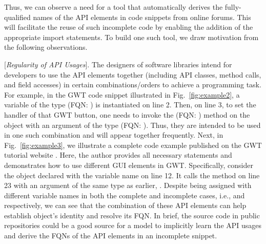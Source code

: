 Thus, we can observe a need for a tool that automatically derives the fully-qualified names of the API elements in code snippets from online forums. This will facilitate the reuse of such incomplete code by enabling the addition of the appropriate import statements. To build one such tool, we draw motivation from the following observations.

\vspace{2pt}
 [{\em Regularity of API Usages}]. The designers of software libraries intend for developers to use the API elements together (including API classes, method calls, and field accesses) in certain combinations/orders to achieve a programming task. For example, in the GWT code snippet illustrated in Fig.~\ref{fig:example2}, a variable of the type  (FQN: ) is instantiated on line 2. Then, on line 3, to set the handler of that GWT button, one needs to invoke the  (FQN: ) method on the  object with an argument of the type  (FQN: ). Thus,
they are intended to be used in one such combination and will appear together frequently. Next, in Fig.~\ref{fig:example3}, we illustrate a complete code example published on the GWT tutorial website . Here, the author provides all necessary  statements and demonstrates how to use different GUI elements in GWT. Specifically, consider the  object declared with the  variable name on line 12. It calls the method  on line 23 with an argument of the same type as earlier, . 
Despite being assigned with different variable names in both the complete and incomplete cases, i.e.,  and  respectively, we can see that the combination of these API elements can help establish  object's identity and resolve its FQN.
In brief, the source code in public repositories could be a good source for a model to implicitly learn the API usages and derive the FQNs of the API elements in an incomplete snippet.

